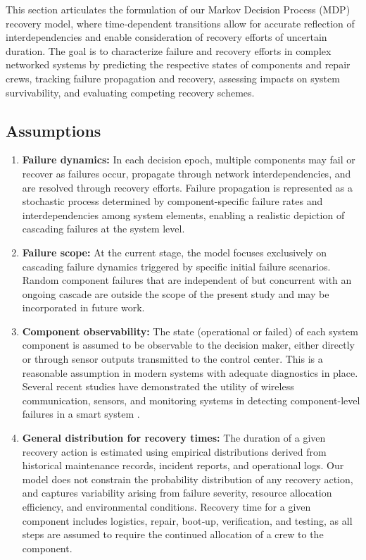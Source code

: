 \documentclass[conference]{IEEEtran}
\begin{document}
This section articulates the formulation of our Markov Decision Process (MDP) recovery model, where time‑dependent transitions allow for accurate reflection of  interdependencies and enable consideration of recovery efforts of uncertain duration. The goal is to characterize failure and recovery efforts in complex networked systems by predicting the respective states of components and repair crews, tracking failure propagation and recovery, assessing impacts on system survivability, and evaluating competing recovery schemes. 

\subsection{Assumptions}

\begin{enumerate}
    
    \item \textbf{Failure dynamics:} In each decision epoch, multiple components may fail or recover as failures occur, propagate through network interdependencies, and are resolved through recovery efforts. Failure propagation is represented as a stochastic process determined by component-specific failure rates and interdependencies among system elements,  enabling a realistic depiction of cascading failures at the system level. \label{assumption failure}

    \item \textbf{Failure scope:} At the current stage, the model focuses exclusively on cascading failure dynamics triggered by specific initial failure scenarios. Random component failures that are independent of but concurrent with an ongoing cascade are outside the scope of the present study and may be incorporated in future work.\label{assumption scope}
    
    \item \textbf{Component observability:} The state (operational or failed) of each system component is assumed to be observable to the decision maker, either directly or through sensor outputs transmitted to the control center. This is a reasonable assumption in modern systems with adequate diagnostics in place. Several recent studies have demonstrated the utility of wireless communication, sensors, and monitoring systems in detecting component-level failures in a smart system \cite{aust_performance_2012, verma_wireless_2014, tashtarian_distributed_2018}. \label{assumption:obser}

    \item \textbf{General distribution for recovery times:} The duration of a given recovery action is estimated using empirical distributions derived from historical maintenance records, incident reports, and operational logs. Our model does not constrain the probability distribution of any recovery action, and captures variability arising from failure severity, resource allocation efficiency, and environmental conditions. Recovery time for a given component includes logistics, repair, boot‑up, verification, and testing, as all steps are assumed to require the continued allocation of a crew to the component.
     \label{assumption:repairt}
    

\end{enumerate}
\end{document}
